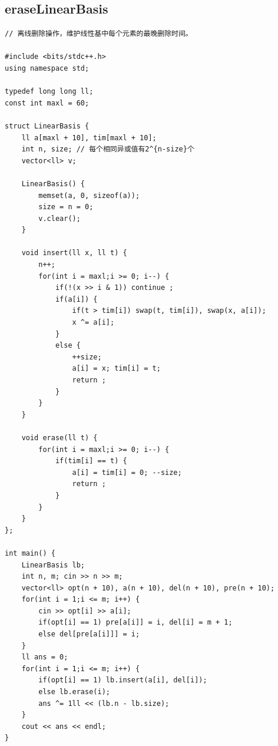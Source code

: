 \documentclass[twoside]{article}
\begin{document}
\subsection{eraseLinearBasis}
\begin{lstlisting}
// 离线删除操作，维护线性基中每个元素的最晚删除时间。

#include <bits/stdc++.h>
using namespace std;

typedef long long ll;
const int maxl = 60;

struct LinearBasis {
    ll a[maxl + 10], tim[maxl + 10]; 
    int n, size; // 每个相同异或值有2^{n-size}个
    vector<ll> v;

    LinearBasis() {
        memset(a, 0, sizeof(a));
        size = n = 0;
        v.clear();
    }

    void insert(ll x, ll t) {
        n++;
        for(int i = maxl;i >= 0; i--) {
            if(!(x >> i & 1)) continue ;
            if(a[i]) {
                if(t > tim[i]) swap(t, tim[i]), swap(x, a[i]);
                x ^= a[i];
            }
            else {
                ++size;
                a[i] = x; tim[i] = t;
                return ;
            }
        }
    }

    void erase(ll t) {
        for(int i = maxl;i >= 0; i--) {
            if(tim[i] == t) {
                a[i] = tim[i] = 0; --size;
                return ;
            }
        }
    }
};

int main() {
    LinearBasis lb;
    int n, m; cin >> n >> m;
    vector<ll> opt(n + 10), a(n + 10), del(n + 10), pre(n + 10);
    for(int i = 1;i <= m; i++) {
        cin >> opt[i] >> a[i];
        if(opt[i] == 1) pre[a[i]] = i, del[i] = m + 1;
        else del[pre[a[i]]] = i;
    }
    ll ans = 0;
    for(int i = 1;i <= m; i++) {
        if(opt[i] == 1) lb.insert(a[i], del[i]);
        else lb.erase(i);
        ans ^= 1ll << (lb.n - lb.size);
    }
    cout << ans << endl;
}\end{lstlisting}
\end{document}
